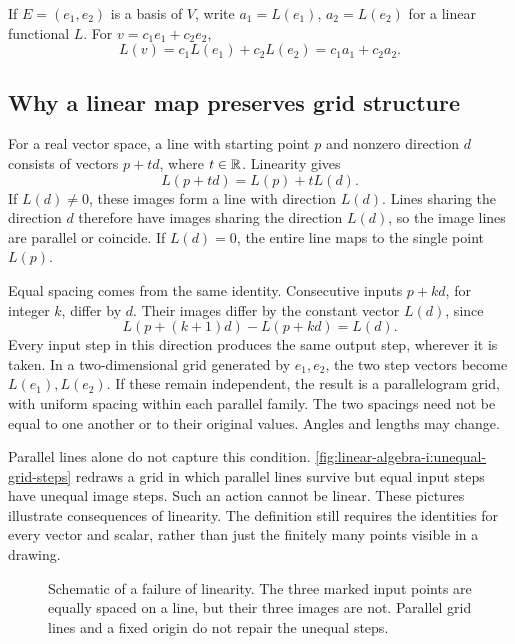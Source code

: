 \begin{example}
  If \(E=(e_1,e_2)\) is a basis of \(V\), write
  \(a_1=L(e_1)\), \(a_2=L(e_2)\) for a linear functional \(L\).
  For \(v=c_1e_1+c_2e_2\),
  \[
    L(v)=c_1L(e_1)+c_2L(e_2)=c_1a_1+c_2a_2.
  \]
\end{example}

\subsection{Why a linear map preserves grid structure}
\label{sec:linear-algebra-i:linear-map-grids}

For a real vector space, a line with starting point \(p\) and nonzero
direction \(d\) consists of vectors \(p+td\), where \(t\in\mathbb{R}\).
Linearity gives
\[
  L(p+td)=L(p)+tL(d).
\]
If \(L(d)\ne0\), these images form a line with direction \(L(d)\).
Lines sharing the direction \(d\) therefore have images sharing the
direction \(L(d)\), so the image lines are parallel or coincide.
If \(L(d)=0\), the entire line maps to the single point \(L(p)\).

Equal spacing comes from the same identity. Consecutive inputs
\(p+kd\), for integer \(k\), differ by \(d\). Their images differ by
the constant vector \(L(d)\), since
\[
  L(p+(k+1)d)-L(p+kd)=L(d).
\]
Every input step in this direction produces the same output step,
wherever it is taken. In a two-dimensional grid generated by
\(e_1,e_2\), the two step vectors become \(L(e_1),L(e_2)\).
If these remain independent, the result is a parallelogram grid, with
uniform spacing within each parallel family. The two spacings need not
be equal to one another or to their original values. Angles and lengths
may change.

Parallel lines alone do not capture this condition.
\autoref{fig:linear-algebra-i:unequal-grid-steps} redraws a grid in
which parallel lines survive but equal input steps have unequal image
steps. Such an action cannot be linear. These pictures illustrate
consequences of linearity. The definition still requires the identities
for every vector and scalar, rather than just the finitely many points
visible in a drawing.
\begin{figure}[htbp]
  \centering
  
  \caption[Parallelism without equal steps]{Schematic of a failure of
    linearity. The three marked input points are equally spaced on a
    line, but their three images are not. Parallel grid lines and a
    fixed origin do not repair the unequal steps.}
  \label{fig:linear-algebra-i:unequal-grid-steps}
\end{figure}

